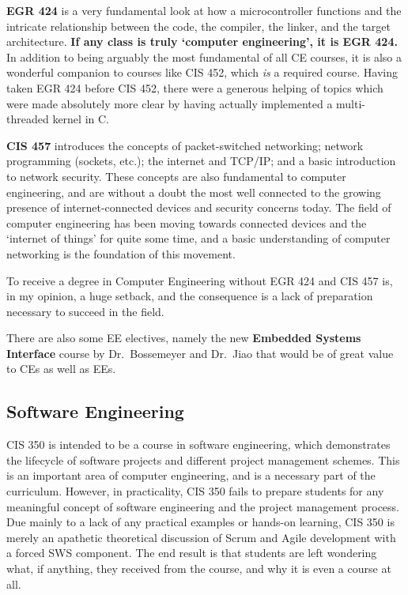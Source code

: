 \documentclass[12pt]{article}
\numberwithin{figure}{section}
\numberwithin{equation}{section}
\begin{document}
{\bigskip

\textbf{EGR 424} is a very fundamental look at how a microcontroller
functions and the intricate relationship between the code, the compiler,
the linker, and the target architecture. \textbf{If any class is truly
`computer engineering', it is EGR 424.} In addition to being arguably
the most fundamental of all CE courses, it is also a wonderful companion
to courses like CIS 452, which \emph{is} a required course. Having taken
EGR 424 before CIS 452, there were a generous helping of topics which
were made absolutely more clear by having actually implemented a
multi-threaded kernel in C.

\bigskip

\textbf{CIS 457} introduces the concepts of packet-switched networking;
network programming (sockets, etc.); the internet and TCP/IP; and a
basic introduction to network security. These concepts are also
fundamental to computer engineering, and are without a doubt the most
well connected to the growing presence of internet-connected devices and
security concerns today. The field of computer engineering has been
moving towards connected devices and the `internet of things' for quite
some time, and a basic understanding of computer networking is the
foundation of this movement.

\bigskip

To receive a degree in Computer Engineering without EGR 424 and CIS 457
is, in my opinion, a huge setback, and the consequence is a lack of
preparation necessary to succeed in the field.

\bigskip

There are also some EE electives, namely the new \textbf{Embedded
Systems Interface} course by Dr.~Bossemeyer and Dr.~Jiao that would be
of great value to CEs as well as EEs.

\subsection{Software Engineering}\label{software-engineering}
CIS 350 is intended to be a course in software engineering, which
demonstrates the lifecycle of software projects and different project
management schemes. This is an important area of computer engineering,
and is a necessary part of the curriculum. However, in practicality, CIS
350 fails to prepare students for any meaningful concept of software
engineering and the project management process. Due mainly to a lack of
any practical examples or hands-on learning, CIS 350 is merely an
apathetic theoretical discussion of Scrum and Agile development with a
forced SWS component. The end result is that students are left wondering
what, if anything, they received from the course, and why it is even a
course at all.

}
\end{document}
